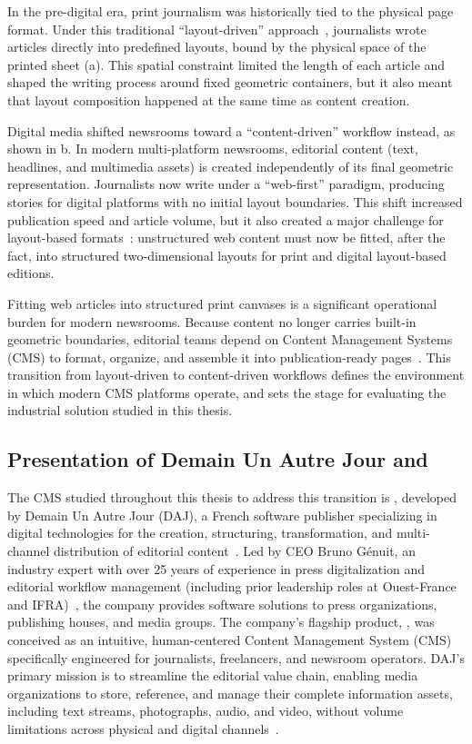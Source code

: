 In the pre-digital era, print journalism was historically tied to the physical page format. Under this traditional ``layout-driven'' approach~\cite{digitizing-news}, journalists wrote articles directly into predefined layouts, bound by the physical space of the printed sheet (a). This spatial constraint limited the length of each article and shaped the writing process around fixed geometric containers, but it also meant that layout composition happened at the same time as content creation.

Digital media shifted newsrooms toward a ``content-driven'' workflow instead, as shown in b. In modern multi-platform newsrooms, editorial content (text, headlines, and multimedia assets) is created independently of its final geometric representation. Journalists now write under a ``web-first'' paradigm, producing stories for digital platforms with no initial layout boundaries. This shift increased publication speed and article volume, but it also created a major challenge for layout-based formats~\cite{newspaper_design_book, newman2024}: unstructured web content must now be fitted, after the fact, into structured two-dimensional layouts for print and digital layout-based editions.

Fitting web articles into structured print canvases is a significant operational burden for modern newsrooms. Because content no longer carries built-in geometric boundaries, editorial teams depend on Content Management Systems (CMS) to format, organize, and assemble it into publication-ready pages~\cite{newspaper_design_book, wagner_trends_2017}. This transition from layout-driven to content-driven workflows defines the environment in which modern CMS platforms operate, and sets the stage for evaluating the industrial solution studied in this thesis.


\subsection{Presentation of Demain Un Autre Jour and \melody}

The CMS studied throughout this thesis to address this transition is \melody, developed by Demain Un Autre Jour (DAJ), a French software publisher specializing in digital technologies for the creation, structuring, transformation, and multi-channel distribution of editorial content~\cite{melody}. Led by CEO Bruno Génuit, an industry expert with over 25 years of experience in press digitalization and editorial workflow management (including prior leadership roles at Ouest-France and IFRA)~\cite{melody}, the company provides software solutions to press organizations, publishing houses, and media groups. The company's flagship product, \melody, was conceived as an intuitive, human-centered Content Management System (CMS) specifically engineered for journalists, freelancers, and newsroom operators. DAJ's primary mission is to streamline the editorial value chain, enabling media organizations to store, reference, and manage their complete information assets, including text streams, photographs, audio, and video, without volume limitations across physical and digital channels~\cite{melody}.

